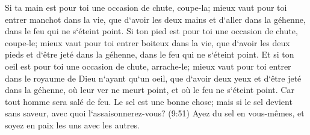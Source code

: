 \verse Si ta main est pour toi une occasion de chute, coupe-la; mieux vaut pour toi entrer manchot dans la vie, 
\verse que d`avoir les deux mains et d`aller dans la géhenne, dans le feu qui ne s`éteint point. 
\verse Si ton pied est pour toi une occasion de chute, coupe-le; mieux vaut pour toi entrer boiteux dans la vie, 
\verse que d`avoir les deux pieds et d`être jeté dans la géhenne, dans le feu qui ne s`éteint point. 
\verse Et si ton oeil est pour toi une occasion de chute, arrache-le; mieux vaut pour toi entrer dans le royaume de Dieu n`ayant qu`un oeil, que d`avoir deux yeux et d`être jeté dans la géhenne, 
\verse où leur ver ne meurt point, et où le feu ne s`éteint point. 
\verse Car tout homme sera salé de feu. 
\verse Le sel est une bonne chose; mais si le sel devient sans saveur, avec quoi l`assaisonnerez-vous? (9:51) Ayez du sel en vous-mêmes, et soyez en paix les uns avec les autres. 

\chapter{}

